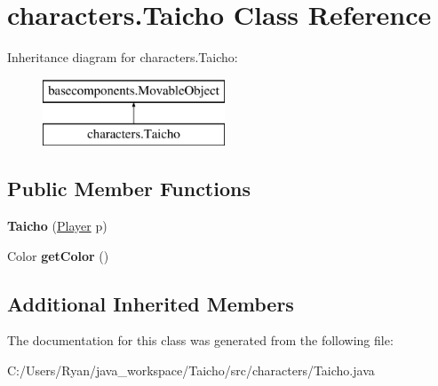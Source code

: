 \hypertarget{classcharacters_1_1_taicho}{\section{characters.\-Taicho Class Reference}
\label{classcharacters_1_1_taicho}
}
Inheritance diagram for characters.\-Taicho\-:\begin{figure}[H]
\begin{center}
\leavevmode
\includegraphics[height=2.000000cm]{classcharacters_1_1_taicho}
\end{center}
\end{figure}
\subsection*{Public Member Functions}
\begin{DoxyCompactItemize}
\item 
\hypertarget{classcharacters_1_1_taicho_a4d8e8ae6f6b1b683544a058366a51315}{{\bfseries Taicho} (\hyperlink{enumenums_1_1_player}{Player} p)}\label{classcharacters_1_1_taicho_a4d8e8ae6f6b1b683544a058366a51315}

\item 
\hypertarget{classcharacters_1_1_taicho_a2af9545ddccb2949d416fd99bf28eb31}{Color {\bfseries get\-Color} ()}\label{classcharacters_1_1_taicho_a2af9545ddccb2949d416fd99bf28eb31}

\end{DoxyCompactItemize}
\subsection*{Additional Inherited Members}


The documentation for this class was generated from the following file\-:\begin{DoxyCompactItemize}
\item 
C\-:/\-Users/\-Ryan/java\-\_\-workspace/\-Taicho/src/characters/Taicho.\-java\end{DoxyCompactItemize}
